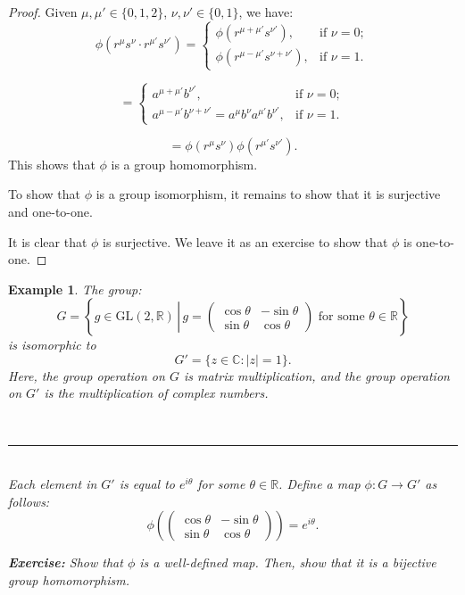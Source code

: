 \documentclass[a4paper,12pt]{report}
\newcommand{\abs}[1]{\left|#1\right|}
\newcommand{\ra}{\longrightarrow}
\newcounter{statement}
\numberwithin{statement}{chapter}
\newtheorem{eg}[statement]{\bf Example}
\numberwithin{equation}{chapter}
\numberwithin{section}{chapter}
\numberwithin{subsection}{section}
\begin{document}
\begin{proof}
Given $\mu, \mu' \in \{0, 1, 2\}$, $\nu, \nu' \in \{0, 1\}$, we have:
\[
\phi(r^\mu s^\nu \cdot r^{\mu'}s^{\nu'}) = 
\begin{cases}
\phi(r^{\mu + \mu'}s^{\nu'}),&\text{if } \nu = 0;\\
\phi(r^{\mu - \mu'}s^{\nu + \nu'}),&\text{if } \nu = 1.
\end{cases}
\]

\[
=
\begin{cases}
a^{\mu + \mu'}b^{\nu'},&\text{if } \nu = 0;\\
a^{\mu - \mu'}b^{\nu + \nu'} = a^{\mu}b^{\nu}a^{\mu'}b^{\nu'},&\text{if } \nu = 1.
\end{cases}
\]

\[
=\phi(r^\mu s^\nu)\phi(r^{\mu'}s^{\nu'}).
\]
This shows that $\phi$ is a group homomorphism.




To show that $\phi$ is a group isomorphism,
it remains to show that it is surjective and one-to-one.



It is clear that $\phi$ is surjective.  We leave it as an exercise
to show that $\phi$ is one-to-one.


\end{proof}




\begin{eg}
The group:
\[
G = \left\{g \in \mathrm{GL}(2, \mathbb{R}) \,\left|\,
g = \left(
\begin{matrix}
\cos \theta & -\sin \theta\\
\sin \theta & \cos \theta
\end{matrix}
\right) \text{ for some } \theta \in \mathbb{R}
\right.
\right\}
\]
is isomorphic to
\[
G' = \{z \in \mathbb{C} : \abs{z} = 1\}.
\]
Here, the group operation on $G$ is matrix multiplication, and the group operation on $G'$ is the multiplication of complex numbers.

\quad\\\hrule
\quad\\


Each element in $G'$ is equal to $e^{i\theta}$ for some $\theta \in \mathbb{R}$.
Define a map $\phi : G \ra G'$ as follows:
\[
\phi\left(\left(
\begin{matrix}
\cos \theta & -\sin \theta\\
\sin \theta & \cos \theta
\end{matrix}
\right)\right) = e^{i\theta}.
\]

 {\bf Exercise:}  
Show that $\phi$ is a well-defined map.
Then, show that it is a bijective group homomorphism.
\end{eg}
\end{document}
